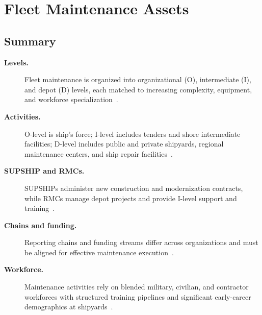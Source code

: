 \documentclass[../main.tex]{subfiles}
\begin{document}
\section{Fleet Maintenance Assets}


\subsection{Summary}
\begin{description}
  \item[\textbf{Levels.}] Fleet maintenance is organized into organizational (O), intermediate (I), and depot (D) levels, each matched to increasing complexity, equipment, and workforce specialization~\autocite{edo-4-1-1-fleet-maint-assets-2025}.
  \item[\textbf{Activities.}] O-level is ship's force; I-level includes tenders and shore intermediate facilities; D-level includes public and private shipyards, regional maintenance centers, and ship repair facilities~\autocite{edo-4-1-1-fleet-maint-assets-2025}.
  \item[\textbf{SUPSHIP and RMCs.}] SUPSHIPs administer new construction and modernization contracts, while RMCs manage depot projects and provide I-level support and training~\autocite{edo-4-1-1-fleet-maint-assets-2025}.
  \item[\textbf{Chains and funding.}] Reporting chains and funding streams differ across organizations and must be aligned for effective maintenance execution~\autocite{edo-4-1-1-fleet-maint-assets-2025}.
  \item[\textbf{Workforce.}] Maintenance activities rely on blended military, civilian, and contractor workforces with structured training pipelines and significant early-career demographics at shipyards~\autocite{edo-4-1-1-fleet-maint-assets-2025}.
\end{description}
\end{document}
